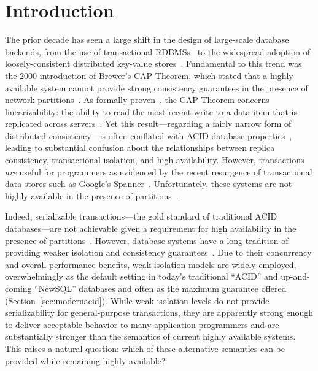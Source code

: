 
\section{Introduction}

The prior decade has seen a large shift in the design of large-scale
database backends, from the use of transactional
RDBMSs~\cite{bernstein-book, gray-isolation, gray-virtues} to the
widespread adoption of loosely-consistent distributed key-value
stores~\cite{bigtable, pnuts, dynamo}. Fundamental to this trend was
the 2000 introduction of Brewer's CAP Theorem, which stated that a
highly available system cannot provide strong consistency guarantees
in the presence of network partitions~\cite{brewer-slides}. As
formally proven~\cite{gilbert-cap}, the CAP Theorem concerns
linearizability: the ability to read the most recent write to a data
item that is replicated across servers~\cite{herlihy-art}. Yet this
result---regarding a fairly narrow form of distributed
consistency---is often conflated with ACID database
properties~\cite{brewer-slides, hn, foundation-article}, leading to
substantial confusion about the relationships between replica
consistency, transactional isolation, and high availability. However,
transactions \textit{are} useful for programmers as evidenced by the
recent resurgence of transactional data stores such as Google's
Spanner~\cite{spanner}. Unfortunately, these systems are not highly
available in the presence of partitions~\cite{middleware-db,
  foundation-article, hstore,generalizedsnapshot, mdcc,
  krikellas-bargain, eiger, walter, calvin}.

Indeed, serializable transactions---the gold standard of traditional
ACID databases---are not achievable given a requirement for high
availability in the presence of
partitions~\cite{davidson-survey}. However, database systems have a
long tradition of providing weaker isolation and consistency
guarantees~\cite{adya, ansicritique, gray-virtues, gray-isolation,
  kemme-thesis}. Due to their concurrency and overall performance
benefits, weak isolation models are widely employed, overwhelmingly as
the default setting in today's traditional ``ACID'' and up-and-coming
``NewSQL'' databases and often as the maximum guarantee offered
(Section~\ref{sec:modernacid}). While weak isolation levels do not
provide serializability for general-purpose transactions, they are
apparently strong enough to deliver acceptable behavior to many
application programmers and are substantially stronger than the
semantics of current highly available systems. This raises a natural
question: which of these alternative semantics can be provided while
remaining highly available?

